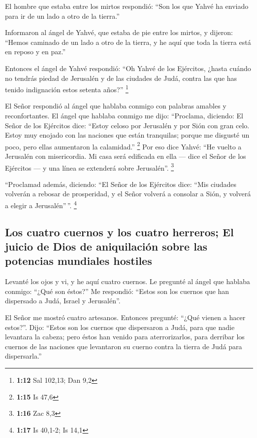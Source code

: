 \begin{paracol}{2}
 El hombre que estaba entre los mirtos respondió: ``Son
los que Yahvé ha enviado para ir de un lado a otro de la tierra.''

 Informaron al ángel de Yahvé, que estaba de pie entre
los mirtos, y dijeron: ``Hemos caminado de un lado a otro de la tierra,
y he aquí que toda la tierra está en reposo y en paz.''

 Entonces el ángel de Yahvé respondió: ``Oh Yahvé de los
Ejércitos, ¿hasta cuándo no tendrás piedad de Jerusalén y de las
ciudades de Judá, contra las que has tenido indignación estos setenta
años?'' \footnote{\textbf{1:12} Sal 102,13; Dan 9,2}

 El Señor respondió al ángel que hablaba conmigo con
palabras amables y reconfortantes.  El ángel que hablaba
conmigo me dijo: ``Proclama, diciendo: El Señor de los Ejércitos dice:
``Estoy celoso por Jerusalén y por Sión con gran celo. 
Estoy muy enojado con las naciones que están tranquilas; porque me
disgusté un poco, pero ellas aumentaron la calamidad.'' \footnote{\textbf{1:15}
  Is 47,6}  Por eso dice Yahvé: ``He vuelto a Jerusalén
con misericordia. Mi casa será edificada en ella --- dice el Señor de
los Ejércitos --- y una línea se extenderá sobre Jerusalén''.
\footnote{\textbf{1:16} Zac 8,3}

 ``Proclamad además, diciendo: ``El Señor de los
Ejércitos dice: ``Mis ciudades volverán a rebosar de prosperidad, y el
Señor volverá a consolar a Sión, y volverá a elegir a Jerusalén''\,''.
\footnote{\textbf{1:17} Is 40,1-2; Is 14,1}

\hypertarget{los-cuatro-cuernos-y-los-cuatro-herreros-el-juicio-de-dios-de-aniquilaciuxf3n-sobre-las-potencias-mundiales-hostiles}{%
\subsection{Los cuatro cuernos y los cuatro herreros; El juicio de Dios
de aniquilación sobre las potencias mundiales
hostiles}\label{los-cuatro-cuernos-y-los-cuatro-herreros-el-juicio-de-dios-de-aniquilaciuxf3n-sobre-las-potencias-mundiales-hostiles}}

 Levanté los ojos y vi, y he aquí cuatro cuernos.
 Le pregunté al ángel que hablaba conmigo: ``¿Qué son
éstos?'' Me respondió: ``Estos son los cuernos que han dispersado a
Judá, Israel y Jerusalén''.

 El Señor me mostró cuatro artesanos. 
Entonces pregunté: ``¿Qué vienen a hacer estos?''. Dijo: ``Estos son los
cuernos que dispersaron a Judá, para que nadie levantara la cabeza; pero
éstos han venido para aterrorizarlos, para derribar los cuernos de las
naciones que levantaron su cuerno contra la tierra de Judá para
dispersarla.''


\end{paracol}
